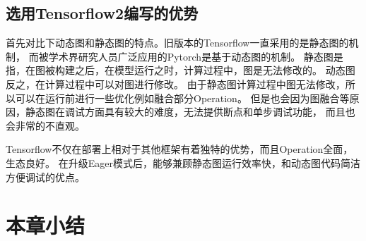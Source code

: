     \subsection{选用Tensorflow2编写的优势}
    首先对比下动态图和静态图的特点。旧版本的Tensorflow一直采用的是静态图的机制，
    而被学术界研究人员广泛应用的Pytorch是基于动态图的机制。
    静态图是指，在图被构建之后，在模型运行之时，计算过程中，图是无法修改的。
    动态图反之，在计算过程中可以对图进行修改。
    由于静态图计算过程中图无法修改，所以可以在运行前进行一些优化例如融合部分Operation。
    但是也会因为图融合等原因，静态图在调试方面具有较大的难度，无法提供断点和单步调试功能，
    而且也会非常的不直观。
  
    Tensorflow不仅在部署上相对于其他框架有着独特的优势，而且Operation全面，生态良好。
    在升级Eager模式后，能够兼顾静态图运行效率快，和动态图代码简洁方便调试的优点。
  

\section{本章小结}


